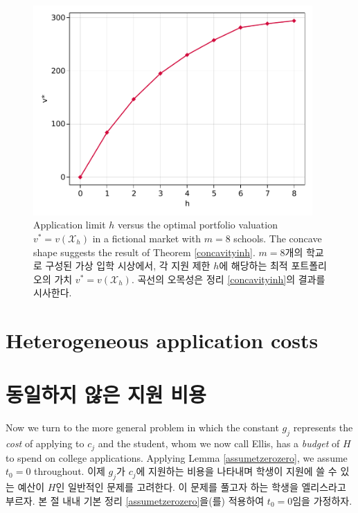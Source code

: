 \documentclass[11pt]{article} %
\theoremstyle{definition}
\theoremstyle{definition}
\begin{document}
\begin{figure}[h!] 
 \centering
 \includegraphics[width=0.95\textwidth]{./plots/h_v-example.pdf}
  \caption{  \label{planetsplot}
  \ifen Application limit $h$ versus the optimal portfolio valuation $v^* = v(\mathcal{X}_h)$ in a fictional market with $m=8$ schools. The concave shape suggests the result of Theorem \ref{concavityinh}. 
  \else $m=8$개의 학교로 구성된 가상 입학 시상에서, 각 지원 제한 $h$에 해당하는 최적 포트폴리오의 가치 $v^* = v(\mathcal{X}_h)$. 곡선의 오목성은 정리 \ref{concavityinh}의 결과를 시사한다.\fi}
\end{figure}








\ifen \section{Heterogeneous application costs} \else\section{동일하지 않은 지원 비용} \fi\label{hetappcosts}
\ifen
Now we turn to the more general problem in which the constant $g_j$ represents the \emph{cost} of applying to $c_j$ and the student, whom we now call Ellis, has a \emph{budget} of $H$ to spend on college applications.  Applying Lemma \ref{assumetzerozero}, we assume $t_0 = 0$ throughout.
\else
이제 $g_j$가 $c_j$에 지원하는 비용을 나타내며 학생이 지원에 쓸 수 있는 예산이 $H$인 일반적인 문제를 고려한다. 이 문제를 풀고자 하는 학생을 엘리스라고 부르자. 본 절 내내 기본 정리 \ref{assumetzerozero}을(를) 적용하여 $t_0 = 0$임을 가정하자.
\fi
\end{document}
